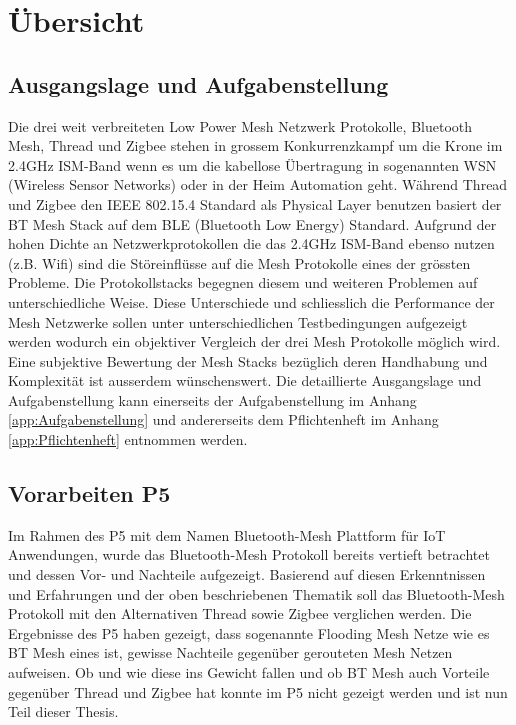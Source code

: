 \clearpage

\section{Übersicht}\label{sec:Uebersicht}

\subsection{Ausgangslage und Aufgabenstellung}\label{subsec:AusgangslageundAufgabenstellung}


Die drei weit verbreiteten Low Power Mesh Netzwerk Protokolle, Bluetooth Mesh, Thread und Zigbee stehen in grossem Konkurrenzkampf um die Krone im 2.4GHz ISM-Band wenn es um die kabellose Übertragung in sogenannten WSN (Wireless Sensor Networks) oder in der Heim Automation geht. Während Thread und Zigbee den IEEE 802.15.4 Standard als Physical Layer benutzen basiert der BT Mesh Stack auf dem BLE (Bluetooth Low Energy) Standard. Aufgrund der hohen Dichte an Netzwerkprotokollen die das 2.4GHz ISM-Band ebenso nutzen (z.B. Wifi) sind die Störeinflüsse auf die Mesh Protokolle eines der grössten Probleme. Die Protokollstacks begegnen diesem und weiteren Problemen auf unterschiedliche Weise. Diese Unterschiede und schliesslich die Performance der Mesh Netzwerke sollen unter unterschiedlichen Testbedingungen aufgezeigt werden wodurch ein objektiver Vergleich der drei Mesh Protokolle möglich wird. Eine subjektive Bewertung der Mesh Stacks bezüglich deren Handhabung und Komplexität ist ausserdem wünschenswert.
Die detaillierte Ausgangslage und Aufgabenstellung kann einerseits der Aufgabenstellung im Anhang \ref{app:Aufgabenstellung} und andererseits dem Pflichtenheft im Anhang \ref{app:Pflichtenheft} entnommen werden.

\subsection{Vorarbeiten P5}\label{subsec:VorarbeitenP5}

Im Rahmen des P5 mit dem Namen Bluetooth-Mesh Plattform für IoT Anwendungen, wurde das Bluetooth-Mesh Protokoll bereits vertieft betrachtet und dessen Vor- und Nachteile aufgezeigt. 
Basierend auf diesen Erkenntnissen und Erfahrungen und der oben beschriebenen Thematik soll das Bluetooth-Mesh Protokoll mit den Alternativen Thread sowie Zigbee verglichen werden.
Die Ergebnisse des P5 haben gezeigt, dass sogenannte Flooding Mesh Netze wie es BT Mesh eines ist, gewisse Nachteile gegenüber gerouteten Mesh Netzen aufweisen. Ob und wie diese ins Gewicht fallen und ob BT Mesh auch Vorteile gegenüber Thread und Zigbee hat konnte im P5 nicht gezeigt werden und ist nun Teil dieser Thesis.

